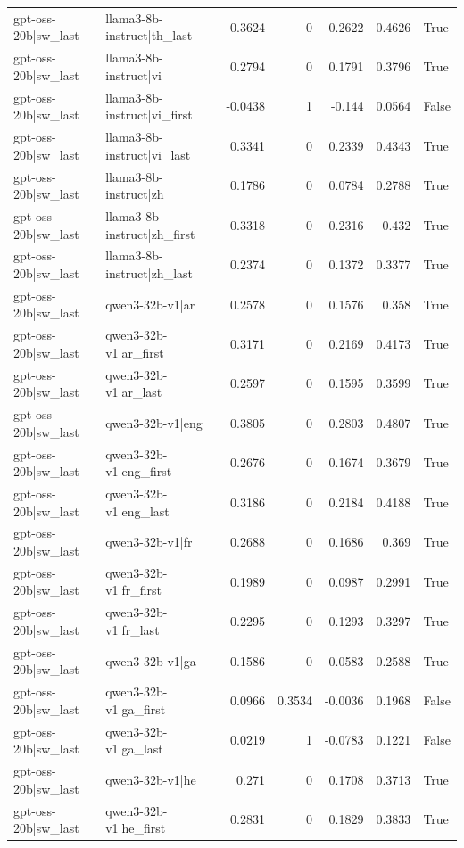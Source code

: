 \begin{table}
\begin{tabular}{l l r r r r l}
gpt-oss-20b|sw_last & llama3-8b-instruct|th_last & 0.3624 & 0 & 0.2622 & 0.4626 & True \\
gpt-oss-20b|sw_last & llama3-8b-instruct|vi & 0.2794 & 0 & 0.1791 & 0.3796 & True \\
gpt-oss-20b|sw_last & llama3-8b-instruct|vi_first & -0.0438 & 1 & -0.144 & 0.0564 & False \\
gpt-oss-20b|sw_last & llama3-8b-instruct|vi_last & 0.3341 & 0 & 0.2339 & 0.4343 & True \\
gpt-oss-20b|sw_last & llama3-8b-instruct|zh & 0.1786 & 0 & 0.0784 & 0.2788 & True \\
gpt-oss-20b|sw_last & llama3-8b-instruct|zh_first & 0.3318 & 0 & 0.2316 & 0.432 & True \\
gpt-oss-20b|sw_last & llama3-8b-instruct|zh_last & 0.2374 & 0 & 0.1372 & 0.3377 & True \\
gpt-oss-20b|sw_last & qwen3-32b-v1|ar & 0.2578 & 0 & 0.1576 & 0.358 & True \\
gpt-oss-20b|sw_last & qwen3-32b-v1|ar_first & 0.3171 & 0 & 0.2169 & 0.4173 & True \\
gpt-oss-20b|sw_last & qwen3-32b-v1|ar_last & 0.2597 & 0 & 0.1595 & 0.3599 & True \\
gpt-oss-20b|sw_last & qwen3-32b-v1|eng & 0.3805 & 0 & 0.2803 & 0.4807 & True \\
gpt-oss-20b|sw_last & qwen3-32b-v1|eng_first & 0.2676 & 0 & 0.1674 & 0.3679 & True \\
gpt-oss-20b|sw_last & qwen3-32b-v1|eng_last & 0.3186 & 0 & 0.2184 & 0.4188 & True \\
gpt-oss-20b|sw_last & qwen3-32b-v1|fr & 0.2688 & 0 & 0.1686 & 0.369 & True \\
gpt-oss-20b|sw_last & qwen3-32b-v1|fr_first & 0.1989 & 0 & 0.0987 & 0.2991 & True \\
gpt-oss-20b|sw_last & qwen3-32b-v1|fr_last & 0.2295 & 0 & 0.1293 & 0.3297 & True \\
gpt-oss-20b|sw_last & qwen3-32b-v1|ga & 0.1586 & 0 & 0.0583 & 0.2588 & True \\
gpt-oss-20b|sw_last & qwen3-32b-v1|ga_first & 0.0966 & 0.3534 & -0.0036 & 0.1968 & False \\
gpt-oss-20b|sw_last & qwen3-32b-v1|ga_last & 0.0219 & 1 & -0.0783 & 0.1221 & False \\
gpt-oss-20b|sw_last & qwen3-32b-v1|he & 0.271 & 0 & 0.1708 & 0.3713 & True \\
gpt-oss-20b|sw_last & qwen3-32b-v1|he_first & 0.2831 & 0 & 0.1829 & 0.3833 & True \\

\end{tabular}
\end{table}
